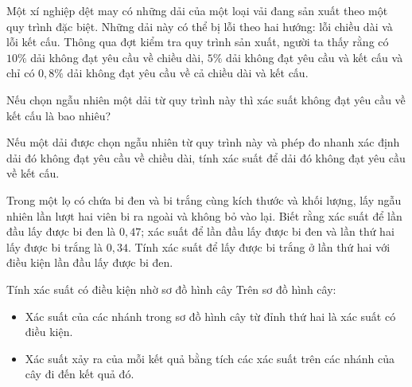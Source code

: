 \begin{bt}%
	Một xí nghiệp dệt may có những dải của một loại vải đang sản xuất theo một quy trình đặc biệt. Những dải này có thể bị lỗi theo hai hướng: lỗi chiều dài và lỗi kết cấu. Thông qua đợt kiểm tra quy trình sản xuất, người ta thấy rằng có $10\%$ dải không đạt yêu cầu về chiều dài, $5\%$ dải không đạt yêu cầu và kết cấu và chỉ có $0{,}8\%$ dải không đạt yêu cầu về cả chiều dài và kết cấu.
	\begin{listEX}
	\item Nếu chọn ngẫu nhiên một dải từ quy trình này thì xác suất không đạt yêu cầu về kết cấu là bao nhiêu?
	\item Nếu một dải được chọn ngẫu nhiên từ quy trình này và phép đo nhanh xác định dải đó không đạt yêu cầu về chiều dài, tính xác suất để dải đó không đạt yêu cầu về kết cấu.
	\end{listEX}
\end{bt}
\begin{bt}%
	Trong một lọ có chứa bi đen và bi trắng cùng kích thước và khối lượng, lấy ngẫu nhiên lần lượt hai viên bi ra ngoài và không bỏ vào lại. Biết rằng xác suất để lần đầu lấy được bi đen là $0{,}47$; xác suất để lần đầu lấy được bi đen và lần thứ hai lấy được bi trắng là $0{,34}$. Tính xác suất để lấy được bi trắng ở lần thứ hai với điều kiện lần đầu lấy được bi đen.
\end{bt}
\begin{dang}{Tính xác suất có điều kiện nhờ sơ đồ hình cây}
	Trên sơ đồ hình cây:
	\begin{itemize}
	\item Xác suất của các nhánh trong sơ đồ hình cây từ đỉnh thứ hai là xác suất có điều kiện.
	\item Xác suất xảy ra của mỗi kết quả bằng tích các xác suất trên các nhánh của cây đi đến kết quả đó.
	\end{itemize}
\end{dang}
